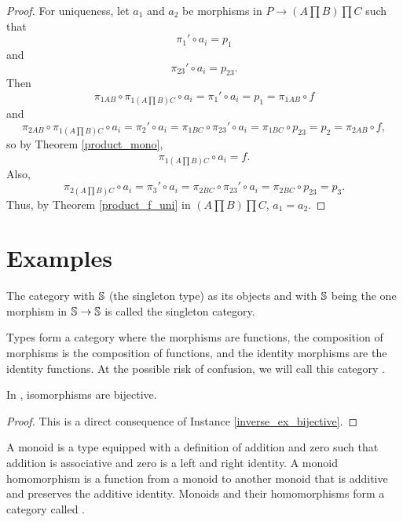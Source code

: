 \documentclass[../math.tex]{subfiles}
\begin{document}
\begin{proof}
    For uniqueness, let $a_1$ and $a_2$ be morphisms in $P \to (A \prod B) \prod
    C$ such that
    \[
        \pi_1' \circ a_i = p_1
    \]
    and
    \[
        \pi_{23}' \circ a_i = p_{23}.
    \]
    Then
    \[
        \pi_{1AB} \circ \pi_{1 (A \prod B) C} \circ a_i
        = \pi_1' \circ a_i
        = p_1
        = \pi_{1AB} \circ f
    \]
    and
    \[
        \pi_{2AB} \circ \pi_{1 (A \prod B) C} \circ a_i
        = \pi_2' \circ a_i
        = \pi_{1BC} \circ \pi_{23}' \circ a_i
        = \pi_{1BC} \circ p_{23}
        = p_2
        = \pi_{2AB} \circ f,
    \]
    so by Theorem \ref{product_mono},
    \[
        \pi_{1 (A \prod B) C} \circ a_i = f.
    \]
    Also,
    \[
        \pi_{2 (A \prod B) C} \circ a_i
        = \pi_3' \circ a_i
        = \pi_{2BC} \circ \pi_{23}' \circ a_i
        = \pi_{2BC} \circ p_{23}
        = p_3.
    \]
    Thus, by Theorem \ref{product_f_uni} in $(A \prod B) \prod C$, $a_1 = a_2$.
\end{proof}

\section{Examples}

\begin{definition}
    The category with $\S$ (the singleton type) as its objects and with $\S$
    being the one morphism in $\S \to \S$ is called the singleton category.
\end{definition}

\begin{definition}
    Types form a category where the morphisms are functions, the composition of
    morphisms is the composition of functions, and the identity morphisms are
    the identity functions.  At the possible risk of confusion, we will call
    this category \Type.
\end{definition}

\begin{theorem}
    In \Type, isomorphisms are bijective.
\end{theorem}
\begin{proof}
    This is a direct consequence of Instance \ref{inverse_ex_bijective}.
\end{proof}

\begin{definition}
    A monoid is a type equipped with a definition of addition and zero such that
    addition is associative and zero is a left and right identity.  A monoid
    homomorphism is a function from a monoid to another monoid that is additive
    and preserves the additive identity.  Monoids and their homomorphisms form a
    category called .
\end{definition}
\end{document}
